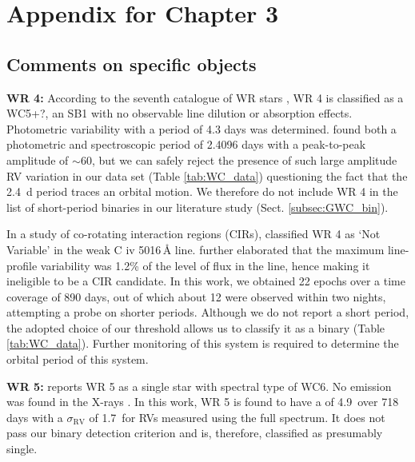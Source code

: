 \chapter{Appendix for Chapter 3}

\section{Comments on specific objects}\label{apdx:comments}

\textbf{WR 4:} According to the seventh catalogue of WR stars \citep{2001vanderHucht}, WR 4 is classified as a WC5+?, an SB1 with no observable line dilution or absorption effects. Photometric variability with a period of 4.3 days \citep{1986MoffatShara} was determined. \citet{1989RustamovCherepashchuk} found both a photometric and spectroscopic period of 2.4096 days with a peak-to-peak amplitude of ${\sim}$60\kms, but we can safely reject the presence of such large amplitude RV variation in our data set (Table \ref{tab:WC_data}) questioning the fact that the 2.4~d period traces  an orbital motion. We therefore do not include WR 4 in the list of short-period binaries in our literature study (Sect. \ref{subsec:GWC_bin}).

In a study of co-rotating interaction regions (CIRs), \citet{st-louis_systematic_2009} classified WR 4 as `Not Variable' in the weak C {\sc iv} 5016\,\r{A} line. \citet{2011CheneStLouis} further elaborated that the maximum line-profile variability was 1.2\% of the level of flux in the line, hence making it ineligible to be a CIR candidate. In this work, we obtained 22 epochs over a time coverage of 890 days, out of which about 12 were observed within two nights, attempting a probe on shorter periods. Although we do not report a short period, the adopted choice of our threshold allows us to classify it as a binary (Table \ref{tab:WC_data}). Further monitoring of this system is required to determine the orbital period of this system.


\textbf{WR 5:} \citet{2001vanderHucht} reports WR 5 as a single star with spectral type of WC6. No emission was found in the X-rays \citep{Skinner2006,2009GudelNaze}. In this work, WR 5 is found to have a \DelRV{} of 4.9\,\kms{} over 718 days with a $\sigma_\textrm{RV}$ of 1.7\,\kms{} for RVs measured using the full spectrum. It does not pass our binary detection criterion and is, therefore, classified as presumably single.

